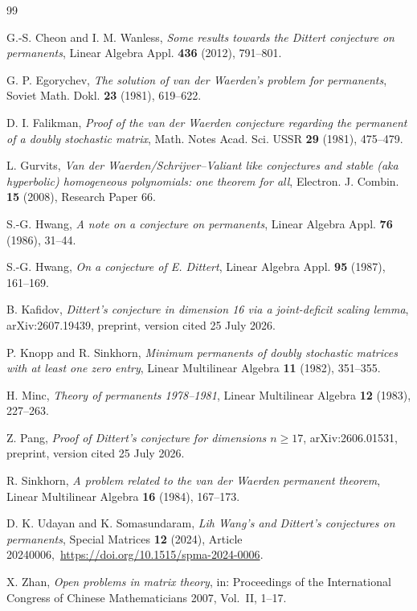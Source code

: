 \documentclass[11pt,a4paper]{article}
\numberwithin{equation}{section}
\theoremstyle{definition}
\newcommand{\1}{\mathbf{1}}
\begin{document}
\begin{thebibliography}{99}

G.-S. Cheon and I. M. Wanless,
\emph{Some results towards the Dittert conjecture on permanents},
Linear Algebra Appl. \textbf{436} (2012), 791--801.

G. P. Egorychev,
\emph{The solution of van der Waerden's problem for permanents},
Soviet Math. Dokl. \textbf{23} (1981), 619--622.

D. I. Falikman,
\emph{Proof of the van der Waerden conjecture regarding the permanent of a doubly stochastic matrix},
Math. Notes Acad. Sci. USSR \textbf{29} (1981), 475--479.

L. Gurvits,
\emph{Van der Waerden/Schrijver--Valiant like conjectures and stable (aka hyperbolic) homogeneous polynomials: one theorem for all},
Electron. J. Combin. \textbf{15} (2008), Research Paper 66.

S.-G. Hwang,
\emph{A note on a conjecture on permanents},
Linear Algebra Appl. \textbf{76} (1986), 31--44.

S.-G. Hwang,
\emph{On a conjecture of E. Dittert},
Linear Algebra Appl. \textbf{95} (1987), 161--169.

B. Kafidov,
\emph{Dittert's conjecture in dimension 16 via a joint-deficit scaling lemma},
arXiv:2607.19439, preprint, version cited 25 July 2026.

P. Knopp and R. Sinkhorn,
\emph{Minimum permanents of doubly stochastic matrices with at least one zero entry},
Linear Multilinear Algebra \textbf{11} (1982), 351--355.

H. Minc,
\emph{Theory of permanents 1978--1981},
Linear Multilinear Algebra \textbf{12} (1983), 227--263.

Z. Pang,
\emph{Proof of Dittert's conjecture for dimensions $n\ge17$},
arXiv:2606.01531, preprint, version cited 25 July 2026.

R. Sinkhorn,
\emph{A problem related to the van der Waerden permanent theorem},
Linear Multilinear Algebra \textbf{16} (1984), 167--173.

D. K. Udayan and K. Somasundaram,
\emph{Lih Wang's and Dittert's conjectures on permanents},
Special Matrices \textbf{12} (2024), Article 20240006,\
\url{https://doi.org/10.1515/spma-2024-0006}.

X. Zhan,
\emph{Open problems in matrix theory},
in: Proceedings of the International Congress of Chinese Mathematicians 2007, Vol.~II, 1--17.

\end{thebibliography}
\end{document}
